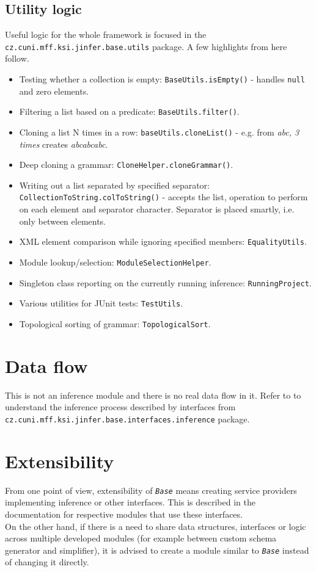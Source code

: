 \documentclass[a4paper,10pt,oneside]{article}
\newcommand{\code}[1]{\texttt{#1}}
\newcommand{\jmodule}[1]{\texttt{\textit{#1}}}
\begin{document}
\subsection{Utility logic}

Useful logic for the whole framework is focused in the \code{cz.cuni.mff.ksi.jinfer.base.utils} package. A few highlights from here follow.
\begin{itemize}
	\item Testing whether a collection is empty: \code{BaseUtils.isEmpty()} - handles \code{null} and zero elements.
	\item Filtering a list based on a predicate: \code{BaseUtils.filter()}.
	\item Cloning a list N times in a row: \code{baseUtils.cloneList()} - e.g. from \emph{abc, 3 times} creates \emph{abcabcabc}.
	\item Deep cloning a grammar: \code{CloneHelper.cloneGrammar()}.
	\item Writing out a list separated by specified separator: \code{CollectionToString.colToString()} - accepts the list, operation to perform on each element and separator character. Separator is placed smartly, i.e. only between elements.
	\item XML element comparison while ignoring specified members: \code{EqualityUtils}.
	\item Module lookup/selection: \code{ModuleSelectionHelper}.
	\item Singleton class reporting on the currently running inference: \code{RunningProject}.
	\item Various utilities for JUnit tests: \code{TestUtils}.
	\item Topological sorting of grammar: \code{TopologicalSort}. 
\end{itemize}

\section{Data flow}

This is not an inference module and there is no real data flow in it. Refer to \cite{archdoc} to understand the inference process described by interfaces from \code{cz.cuni.mff.ksi.jinfer.base.interfaces.inference} package.

\section{Extensibility}

From one point of view, extensibility of \jmodule{Base} means creating service providers implementing inference or other interfaces. This is described in the documentation for respective modules that use these interfaces.\\
On the other hand, if there is a need to share data structures, interfaces or logic across multiple developed modules (for example between custom schema generator and simplifier), it is advised to create a module similar to \jmodule{Base} instead of changing it directly.

\nocite{*}
\newpage


\end{document}

